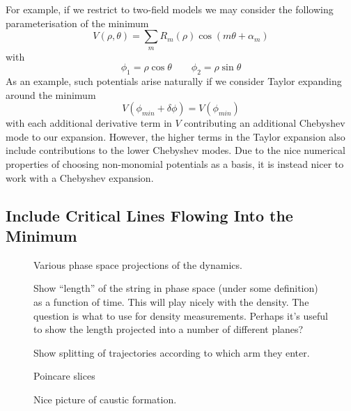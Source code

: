 \documentclass[11pt,a4paper]{article}
\begin{document}
For example, if we restrict to two-field models we may consider the following parameterisation of the minimum
\begin{equation}
  V(\rho,\theta) = \sum_{m} R_m(\rho)\cos(m\theta + \alpha_m)
\end{equation}
with
\begin{equation}
  \phi_1 = \rho\cos\theta \qquad \phi_2 = \rho\sin\theta
\end{equation}
As an example, such potentials arise naturally if we consider Taylor expanding around the minimum
\begin{equation}
  V(\phi_{min}+\delta\phi) = V(\phi_{min})
\end{equation}
with each additional derivative term in $V$ contributing an additional Chebyshev mode to our expansion.
However, the higher terms in the Taylor expansion also include contributions to the lower Chebyshev modes.
Due to the nice numerical properties of choosing non-monomial potentials as a basis, it is instead nicer to work with a Chebyshev expansion.

\subsection{Include Critical Lines Flowing Into the Minimum}

\begin{figure}
  \caption{Various phase space projections of the dynamics.}
\end{figure}

\begin{figure}
  \caption{Show ``length'' of the string in phase space (under some definition) as a function of time.  This will play nicely with the density.  The question is what to use for density measurements.  Perhaps it's useful to show the length projected into a number of different planes?}
\end{figure}

\begin{figure}
  \caption{Show splitting of trajectories according to which arm they enter.}
\end{figure}

\begin{figure}
  \caption{Poincare slices}
\end{figure}

\begin{figure}
  \caption{Nice picture of caustic formation.}
\end{figure}
\end{document}
